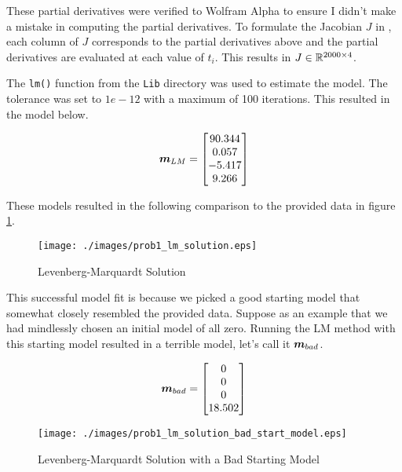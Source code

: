 These partial derivatives were verified to Wolfram Alpha to ensure I didn't make a mistake in computing the partial derivatives. To formulate the Jacobian $J$ in \MATLAB, each column of $J$ corresponds to the partial derivatives above and the partial derivatives are evaluated at each value of $t_i$. This results in $J \in \mathbb{R}^{2000 \times 4}$. 

The \verb|lm()| function from the \verb|Lib| directory was used to estimate the model. The tolerance was set to $1e-12$ with a maximum of 100 iterations. This resulted in the model below. 

\begin{align*}
	\boldsymbol{m}_{LM} = \begin{bmatrix} 90.344 \\ 0.057 \\ -5.417 \\ 9.266 \end{bmatrix}
\end{align*}

These models resulted in the following comparison to the provided data in figure \ref{fig: prob1 lm solution}. 

\begin{figure}[h] 
	\centering
	\texttt{[image: ./images/prob1\_lm\_solution.eps]}
	\caption{Levenberg-Marquardt Solution}
	\label{fig: prob1 lm solution}
\end{figure}
\FloatBarrier

This successful model fit is because we picked a good starting model that somewhat closely resembled the provided data. Suppose as an example that we had mindlessly chosen an initial model of all zero. Running the LM method with this starting model resulted in a terrible model, let's call it $\boldsymbol{m}_{bad}$. 

\begin{align*}
	\boldsymbol{m}_{bad} = \begin{bmatrix} 0 \\ 0 \\ 0 \\ 18.502 \end{bmatrix}
\end{align*}

\begin{figure}[h] 
	\centering
	\texttt{[image: ./images/prob1\_lm\_solution\_bad\_start\_model.eps]}
	\caption{Levenberg-Marquardt Solution with a Bad Starting Model}
	\label{fig: prob1 bad starting model}
\end{figure}
\FloatBarrier

